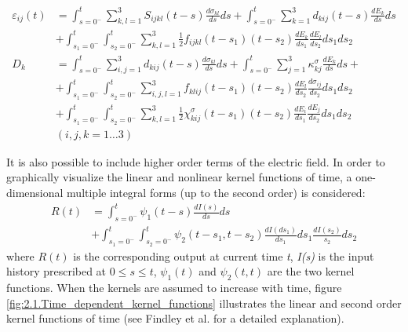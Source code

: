 \begin{equation}
\begin{aligned}
\varepsilon _{ij} (t) &=
\int_{s=0^{-}}^{t} 
\sum_{k,l=1}^3 {S_{ijkl}}(t-s)
\frac{d{\sigma_{kl}}}{ds}ds
+
\int_{s=0^{-}}^{t} 
\sum_{k=1}^3 d_{kij}(t-s)
\frac{d{E_k}}{ds}ds  \\
&+ \int_{s_1=0^{-}}^{t}
\int_{s_2=0^{-}}^{t} 
\sum_{k,l=1}^3 
\frac{1}{2}{f}_{ijkl}(t-s_1)(t-s_2)
\frac{d{E_k}}{ds_1}
\frac{d{E_l}}{ds_2}ds_1 ds_2
\\
{D_k} &=  
\int_{s=0^{-}}^{t} \sum_{i,j=1}^3 {d_{kij}}(t-s)
\frac{d{\sigma_{kl}}}{ds}ds + 
\int_{s=0^{-}}^{t} 
\sum_{j=1}^3 {\kappa^{\sigma}_{kj}}
\frac{d{E_k}}{ds}ds + \\
&+ \int_{s_1=0^{-}}^{t}
\int_{s_2=0^{-}}^{t} 
\sum_{i,j,l=1}^3 {f}_{klij}(t-s_1)(t-s_2) \frac{d{E_l}}{ds_2}\frac{d{ \sigma _{ij} }}{ds_2}ds_1  ds_2
\\
&+ 
\int_{s_1=0^{-}}^{t}
\int_{s_2=0^{-}}^{t} 
\sum_{k,l=1}^3 
\frac{1}{2}\chi^{\sigma}_{kij}(t-s_1)(t-s_2)
\frac{d{E_i}}{ds_1}
\frac{d{E_j}}{ds_2}ds_1 ds_2 \\
& (i,j,k=1 \dots 3)  
\end{aligned}
\label{EQN:double_integral_constitutive_equation}
\end{equation} 
 
It is also possible to include higher order terms of the electric field. 
In order to graphically visualize the linear and nonlinear kernel functions of time,
 a one-dimensional multiple integral forms (up to the second order) is considered:
\begin{equation}
\begin{aligned}
R(t)&=\int_{s=0^{-}}^{t} \psi_1(t-s)\frac{dI(s)}{ds}ds \\
&   +\int_{s_1=0^{-}}^{t}\int_{s_2=0^{-}}^{t}\psi_2(t-s_1,t-s_2) \frac{dI(ds_1)}{ds_1}ds_1 \frac{dI(s_2)}{s_2}ds_2
\end{aligned}
\label{EQN:double_integral_sample}
\end{equation}
where $R(t)$ is the corresponding output at current time \textit{t}, \textit{I(s)} is the input history prescribed at $0\leq s \leq t$, $\psi_1(t)$ and $\psi_2(t,t)$ are the two kernel functions.
When the kernels are assumed to increase with time, 
figure \ref{fig:2.1.Time_dependent_kernel_functions} illustrates the linear and second order kernel functions of time 
(see Findley et al. \cite{Findley1976} for a detailed explanation). 

